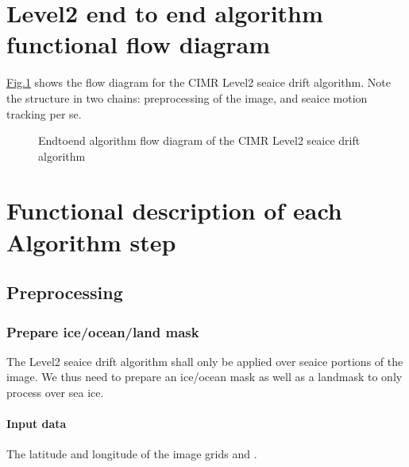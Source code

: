 \documentclass[letterpaper,10pt,english]{jupyterBook}
\begin{document}
\section{Level\sphinxhyphen{}2 end to end algorithm functional flow diagram}
\label{\detokenize{baseline_algorithm_definition:level-2-end-to-end-algorithm-functional-flow-diagram}}
\sphinxAtStartPar
\hyperref[\detokenize{baseline_algorithm_definition:fig-flow-diagram}]{Fig.\@ \ref{\detokenize{baseline_algorithm_definition:fig-flow-diagram}}} shows the flow diagram for the CIMR Level\sphinxhyphen{}2 sea\sphinxhyphen{}ice drift algorithm. Note the structure in two chains: preprocessing of the image, and sea\sphinxhyphen{}ice motion tracking per se.

\begin{figure}[htbp]
\centering
\capstart

\noindent{}
\caption{End\sphinxhyphen{}to\sphinxhyphen{}end algorithm flow diagram of the CIMR Level\sphinxhyphen{}2 sea\sphinxhyphen{}ice drift algorithm}\label{\detokenize{baseline_algorithm_definition:fig-flow-diagram}}\end{figure}


\section{Functional description of each Algorithm step}
\label{\detokenize{baseline_algorithm_definition:functional-description-of-each-algorithm-step}}

\subsection{Pre\sphinxhyphen{}processing}
\label{\detokenize{baseline_algorithm_definition:pre-processing}}

\subsubsection{Prepare ice/ocean/land mask}
\label{\detokenize{baseline_algorithm_definition:prepare-ice-ocean-land-mask}}
\sphinxAtStartPar
The Level\sphinxhyphen{}2 sea\sphinxhyphen{}ice drift algorithm shall only be applied over sea\sphinxhyphen{}ice portions of the image. We thus need to prepare an ice/ocean mask as well
as a land\sphinxhyphen{}mask to only process over sea ice.


\paragraph{Input data}
\label{\detokenize{baseline_algorithm_definition:input-data}}
\sphinxAtStartPar
The latitude and longitude of the image grids  and .
\end{document}
